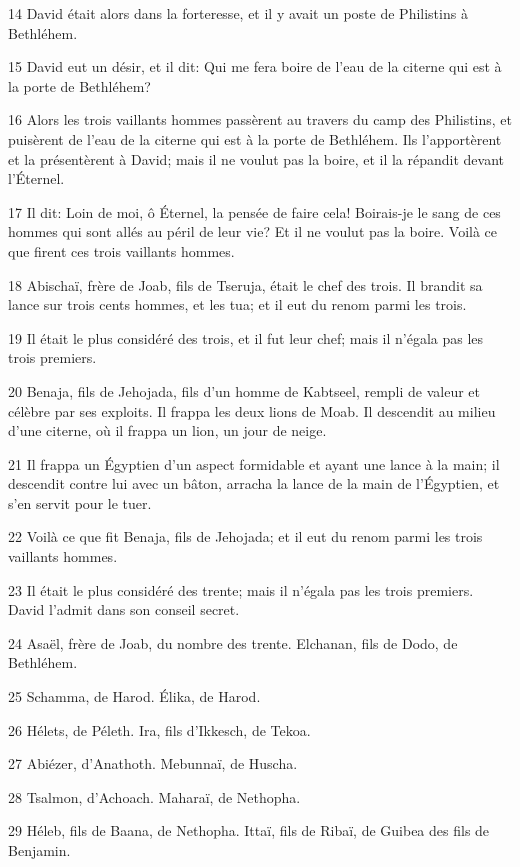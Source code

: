 \par 14 David était alors dans la forteresse, et il y avait un poste de Philistins à Bethléhem.
\par 15 David eut un désir, et il dit: Qui me fera boire de l'eau de la citerne qui est à la porte de Bethléhem?
\par 16 Alors les trois vaillants hommes passèrent au travers du camp des Philistins, et puisèrent de l'eau de la citerne qui est à la porte de Bethléhem. Ils l'apportèrent et la présentèrent à David; mais il ne voulut pas la boire, et il la répandit devant l'Éternel.
\par 17 Il dit: Loin de moi, ô Éternel, la pensée de faire cela! Boirais-je le sang de ces hommes qui sont allés au péril de leur vie? Et il ne voulut pas la boire. Voilà ce que firent ces trois vaillants hommes.
\par 18 Abischaï, frère de Joab, fils de Tseruja, était le chef des trois. Il brandit sa lance sur trois cents hommes, et les tua; et il eut du renom parmi les trois.
\par 19 Il était le plus considéré des trois, et il fut leur chef; mais il n'égala pas les trois premiers.
\par 20 Benaja, fils de Jehojada, fils d'un homme de Kabtseel, rempli de valeur et célèbre par ses exploits. Il frappa les deux lions de Moab. Il descendit au milieu d'une citerne, où il frappa un lion, un jour de neige.
\par 21 Il frappa un Égyptien d'un aspect formidable et ayant une lance à la main; il descendit contre lui avec un bâton, arracha la lance de la main de l'Égyptien, et s'en servit pour le tuer.
\par 22 Voilà ce que fit Benaja, fils de Jehojada; et il eut du renom parmi les trois vaillants hommes.
\par 23 Il était le plus considéré des trente; mais il n'égala pas les trois premiers. David l'admit dans son conseil secret.
\par 24 Asaël, frère de Joab, du nombre des trente. Elchanan, fils de Dodo, de Bethléhem.
\par 25 Schamma, de Harod. Élika, de Harod.
\par 26 Hélets, de Péleth. Ira, fils d'Ikkesch, de Tekoa.
\par 27 Abiézer, d'Anathoth. Mebunnaï, de Huscha.
\par 28 Tsalmon, d'Achoach. Maharaï, de Nethopha.
\par 29 Héleb, fils de Baana, de Nethopha. Ittaï, fils de Ribaï, de Guibea des fils de Benjamin.
